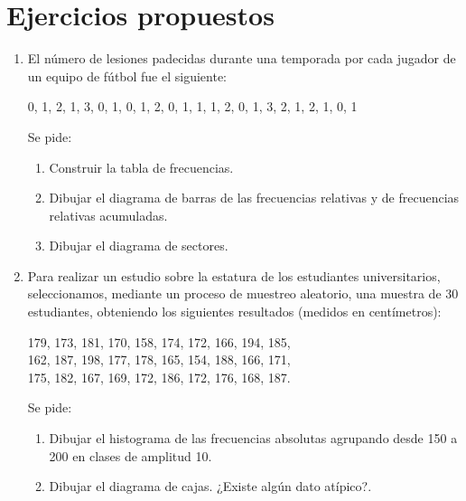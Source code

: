 \section{Ejercicios propuestos}
\begin{enumerate}[leftmargin=*]

\item  El número de lesiones padecidas durante una temporada por cada jugador de un equipo de fútbol fue el siguiente:
\begin{center}
0, 1, 2, 1, 3, 0, 1, 0, 1, 2, 0, 1, 1, 1, 2, 0, 1, 3, 2, 1, 2, 1, 0, 1
\end{center}

Se pide:
\begin{enumerate}
\item Construir la tabla de frecuencias.
\item Dibujar el diagrama de barras de las frecuencias relativas y de frecuencias relativas acumuladas.
\item Dibujar el diagrama de sectores.
\end{enumerate}

\item Para realizar un estudio sobre la estatura de los estudiantes universitarios, seleccionamos, mediante un proceso
de muestreo aleatorio, una muestra de 30 estudiantes, obteniendo los siguientes resultados (medidos en centímetros):
\begin{center}
179, 173, 181, 170, 158, 174, 172, 166, 194, 185,\\
162, 187, 198, 177, 178, 165, 154, 188, 166, 171,\\
175, 182, 167, 169, 172, 186, 172, 176, 168, 187.
\end{center}

Se pide:
\begin{enumerate}
\item Dibujar el histograma de las frecuencias absolutas agrupando desde 150 a 200 en clases de amplitud 10.
\item Dibujar el diagrama de cajas. ¿Existe algún dato atípico?.
\end{enumerate}


\end{enumerate}
